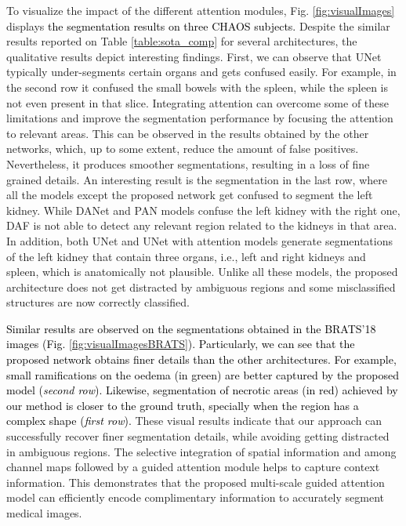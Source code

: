 \documentclass[journal]{IEEEtran}
\begin{document}
To visualize the impact of the different attention modules,  Fig. \ref{fig:visualImages} displays \textcolor{black}{the segmentation results on three CHAOS subjects.} Despite the similar results reported on Table \ref{table:sota_comp} for several architectures, the qualitative results depict interesting findings. First, we can observe that UNet typically under-segments certain organs and gets confused easily. For example, in the second row it confused the small bowels with the spleen, while the spleen is not even present in that slice. Integrating attention can overcome some of these limitations and improve the segmentation performance by focusing the attention to relevant areas. This can be observed in the results obtained by the other networks, which, up to some extent, reduce the amount of false positives. Nevertheless, it produces smoother segmentations, resulting in a loss of fine grained details. An interesting result is the segmentation in the last row, where all the models except the proposed network get confused to segment the left kidney. While DANet and PAN models confuse the left kidney with the right one, DAF is not able to detect any relevant region related to the kidneys in that area. In addition, both UNet and UNet with attention models generate segmentations of the left kidney that contain three organs, i.e., left and right kidneys and spleen, which is anatomically not plausible. Unlike all these models, the proposed architecture does not get distracted by ambiguous regions and some misclassified structures are now correctly classified. 

\textcolor{black}{Similar results are observed on the segmentations obtained in the BRATS'18 images (Fig. \ref{fig:visualImagesBRATS}). Particularly, we can see that the proposed network obtains finer details than the other architectures. For example, small ramifications on the oedema (in green) are better captured by the proposed model (\textit{second row}). Likewise, segmentation of necrotic areas (in red) achieved by our method is closer to the ground truth, specially when the region has a complex shape (\textit{first row}).} These visual results indicate that our approach can successfully recover finer segmentation details, while avoiding getting distracted in ambiguous regions. The selective integration of spatial information and among channel maps followed by a guided attention module helps to capture context information. This demonstrates that the proposed multi-scale guided attention model can efficiently encode complimentary information to accurately segment medical images. 
\end{document}
